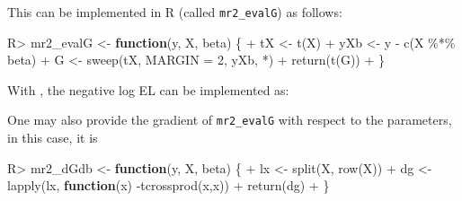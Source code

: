 \documentclass[article]{jss}
\newenvironment{Shaded}{\begin{snugshade}}{\end{snugshade}}
\newcommand{\AttributeTok}[1]{\textcolor[rgb]{0.77,0.63,0.00}{#1}}
\newcommand{\ControlFlowTok}[1]{\textcolor[rgb]{0.13,0.29,0.53}{\textbf{#1}}}
\newcommand{\DecValTok}[1]{\textcolor[rgb]{0.00,0.00,0.81}{#1}}
\newcommand{\FunctionTok}[1]{\textcolor[rgb]{0.00,0.00,0.00}{#1}}
\newcommand{\NormalTok}[1]{#1}
\newcommand{\OtherTok}[1]{\textcolor[rgb]{0.56,0.35,0.01}{#1}}
\newcommand{\SpecialCharTok}[1]{\textcolor[rgb]{0.00,0.00,0.00}{#1}}
\newcommand{\StringTok}[1]{\textcolor[rgb]{0.31,0.60,0.02}{#1}}
\renewcommand{\|}{\,|\,}
\begin{document}
This can be implemented in R (called \texttt{mr2\_evalG}) as follows:

\begin{Shaded}
\begin{Highlighting}[]
\NormalTok{R}\SpecialCharTok{\textgreater{}}\NormalTok{ mr2\_evalG }\OtherTok{\textless{}{-}} \ControlFlowTok{function}\NormalTok{(y, X, beta) \{}
\SpecialCharTok{+}\NormalTok{    tX }\OtherTok{\textless{}{-}} \FunctionTok{t}\NormalTok{(X)}
\SpecialCharTok{+}\NormalTok{    yXb }\OtherTok{\textless{}{-}}\NormalTok{ y }\SpecialCharTok{{-}} \FunctionTok{c}\NormalTok{(X }\SpecialCharTok{\%*\%}\NormalTok{ beta)}
\SpecialCharTok{+}\NormalTok{    G }\OtherTok{\textless{}{-}} \FunctionTok{sweep}\NormalTok{(tX, }\AttributeTok{MARGIN =} \DecValTok{2}\NormalTok{, yXb, }\StringTok{\textasciigrave{}}\AttributeTok{*}\StringTok{\textasciigrave{}}\NormalTok{)}
\SpecialCharTok{+}    \FunctionTok{return}\NormalTok{(}\FunctionTok{t}\NormalTok{(G))}
\SpecialCharTok{+}\NormalTok{  \}}
\end{Highlighting}
\end{Shaded}

With , the negative log EL can be implemented as:

\begin{Shaded}
\end{Shaded}

One may also provide the gradient of \texttt{mr2\_evalG} with respect to the parameters, in this case, it is

\begin{Shaded}
\begin{Highlighting}[]
\NormalTok{R}\SpecialCharTok{\textgreater{}}\NormalTok{ mr2\_dGdb }\OtherTok{\textless{}{-}} \ControlFlowTok{function}\NormalTok{(y, X, beta) \{}
\SpecialCharTok{+}\NormalTok{    lx }\OtherTok{\textless{}{-}} \FunctionTok{split}\NormalTok{(X, }\FunctionTok{row}\NormalTok{(X))}
\SpecialCharTok{+}\NormalTok{    dg }\OtherTok{\textless{}{-}} \FunctionTok{lapply}\NormalTok{(lx, }\ControlFlowTok{function}\NormalTok{(x) }\SpecialCharTok{{-}}\FunctionTok{tcrossprod}\NormalTok{(x,x))}
\SpecialCharTok{+}    \FunctionTok{return}\NormalTok{(dg)}
\SpecialCharTok{+}\NormalTok{  \}}
\end{Highlighting}
\end{Shaded}
\end{document}
